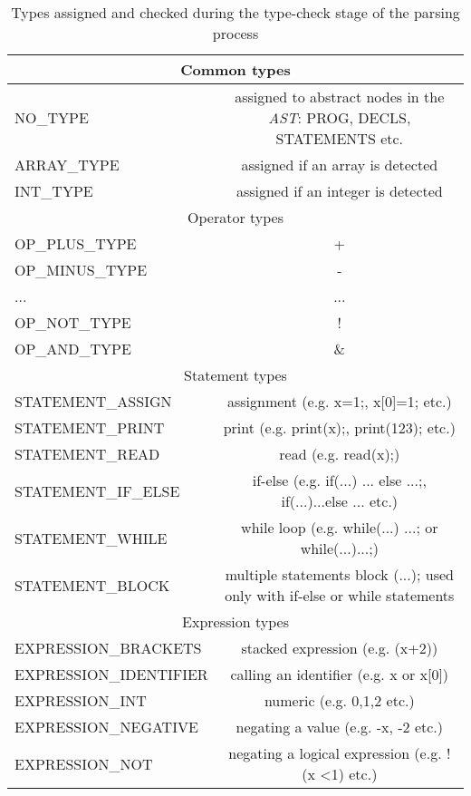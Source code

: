     		\begin{table}
	    		\begin{tabular}{|l|c|}
	    		\hline
	    		\multicolumn{2}{|c|}{\cellcolor[gray]{0.9}Common types} \\ 
	    		\hline
	    		NO\_TYPE & assigned to abstract nodes in the \textit{AST}: PROG, DECLS, STATEMENTS etc. \\ 
	    		\hline 
	    		ARRAY\_TYPE & assigned if an array is detected \\ 
	    		\hline 
	    		INT\_TYPE & assigned if an integer is detected \\ 
	    		\hline \hline
	    		\multicolumn{2}{|c|}{\cellcolor[gray]{0.9}Operator types} \\ 
	    		\hline
	    		OP\_PLUS\_TYPE & + \\ 
	    		\hline 
	    		OP\_MINUS\_TYPE & - \\ 
	    		\hline 
	    		... & ... \\ 
	    		\hline 
	    		OP\_NOT\_TYPE & ! \\ 
	    		\hline 
	    		OP\_AND\_TYPE & \& \\ 
	    		\hline \hline
	    		\multicolumn{2}{|c|}{\cellcolor[gray]{0.9}Statement types} \\ 
	    		\hline
	    		STATEMENT\_ASSIGN & assignment (e.g. x=1;, x[0]=1; etc.) \\ 
	    		\hline 
	    		STATEMENT\_PRINT & print (e.g. print(x);, print(123); etc.) \\ 
	    		\hline 
	    		STATEMENT\_READ & read (e.g. read(x);) \\ 
	    		\hline 
	    		STATEMENT\_IF\_ELSE & if-else (e.g. if(...) ... else ...;, if(...){...}else ... etc.) \\ 
	    		\hline 
	    		STATEMENT\_WHILE & while loop (e.g. while(...) ...; or while(...){...};) \\ 
	    		\hline 
	    		STATEMENT\_BLOCK & multiple statements block ({...}); used only with if-else or while statements \\ 
	    		\hline \hline
	    		\multicolumn{2}{|c|}{\cellcolor[gray]{0.9}Expression types} \\ 
	    		\hline
	    		EXPRESSION\_BRACKETS & stacked expression (e.g. (x+2)) \\
	    		EXPRESSION\_IDENTIFIER & calling an identifier (e.g. x or x[0]) \\ 
	    		\hline 
	    		EXPRESSION\_INT & numeric (e.g. 0,1,2 etc.) \\ 
	    		\hline 
	    		EXPRESSION\_NEGATIVE & negating a value (e.g. -x, -2 etc.) \\ 
	    		\hline 
	    		EXPRESSION\_NOT & negating a logical expression (e.g. !(x \textless 1) etc.) \\ 
	    		\hline
	    		\end{tabular}
	    	\caption{Types assigned and checked during the type-check stage of the parsing process}
    		\label{tab:types}
    		\end{table}
    		
